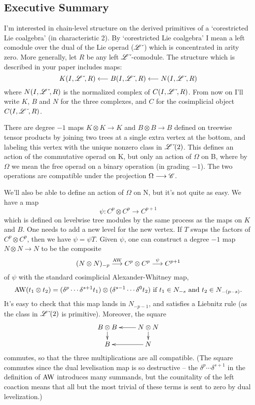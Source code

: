 \documentclass[10pt]{article}
\newcommand{\dual}{\,\check{\,}}
\newcommand{\LieOperad}{\scrL}
\newcommand{\dualLieOperad}{\LieOperad\dual}
\newcommand{\CommOperad}{\scrC}
\begin{document}
\begin{Corestricted Lie coalgebras Executive Summary}
\subsection{Executive Summary}
I'm interested in chain-level structure on the derived primitives of a `corestricted Lie coalgebra' (in characteristic 2). By `corestricted Lie coalgebra' I mean a left comodule over the dual of the Lie operad ($\dualLieOperad$) which is concentrated in arity zero. More generally, let $R$ be any left $\dualLieOperad$-comodule. The structure which is described in your paper includes maps:
\[K(I,\dualLieOperad,R) \from B(I,\dualLieOperad,R) \from N(I,\dualLieOperad,R)\]
where $N(I,\dualLieOperad,R)$ is the normalized complex of $C(I,\dualLieOperad,R)$.
From now on I'll write $K$, $B$ and $N$ for the three complexes, and $C$ for the cosimplicial object $C(I,\dualLieOperad,R)$.

There are degree $-1$ maps $K\otimes K\to K$ and $B\otimes B\to B$ defined on treewise tensor products by joining two trees at a single extra vertex at the bottom, and labeling this vertex with the unique nonzero class in $\dualLieOperad(2)$. This defines an action of the commutative operad on K, but only an action of $\Omega$ on B, where by $\Omega$ we mean the free operad on a binary operation (in grading $-1$). The two operations are compatible under the projection $\Omega\to \CommOperad$.

We'll also be able to define an action of $\Omega$ on N, but it's not quite as easy. We have a map 
\[\psi: C^p\otimes C^p \to C^{p+1}\]
which is defined on levelwise tree modules by the same process as the maps on $K$ and $B$. One needs to add a new level for the new vertex. If $T$ swaps the factors of $C^p\otimes C^p$, then we have $\psi=\psi T$. Given $\psi$, one can construct a degree $-1$ map $N\otimes N \to N$ to be the composite
\[(N\otimes N)_{-p} \overset{\textup{AW}}{\to} C^p\otimes C^p \overset{\psi}{\to} C^{p+1}\]
of $\psi$ with the standard cosimplicial Alexander-Whitney map,
\[\textup{AW}(t_1\otimes t_2)=(\delta^{p}\cdots \delta^{s+1}t_1)\otimes (\delta^{s-1}\cdots \delta^{0}t_2)\textup{ if $t_1\in N_{-s}$ and $t_2\in N_{-(p-s)}$.}\]
It's easy to check that this map lands in $N_{-p-1}$, and satisfies a Liebnitz rule (as the class in $\dualLieOperad(2)$ is primitive). Moreover, the square
\[\xymatrix@R=4mm{
B\otimes B
\ar[d]
&%
\ar[d]
\ar[l]
N\otimes N\\%
B
&%
\ar[l]
N%
}\]
commutes, so that the three multiplications are all compatible. (The square commutes since the dual levelisation map is so destructive -- the $\delta^p\cdots \delta^{s+1}$ in the definition of $\textup{AW}$ introduces many summands, but the counitality of the left coaction means that all but the most trivial of these terms is sent to zero by dual levelization.)


\end{Corestricted Lie coalgebras Executive Summary}
\end{document}
